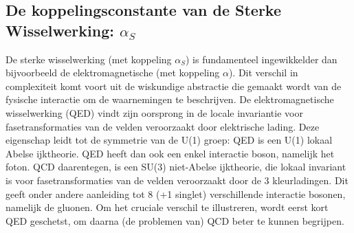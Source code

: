 \documentclass[a4paper,11pt]{article}
\numberwithin{equation}{section} %
\begin{document}
  \subsection{De koppelingsconstante van de Sterke Wisselwerking: $\alpha_S$}
De sterke wisselwerking (met koppeling $\alpha_S$) is fundamenteel ingewikkelder dan bijvoorbeeld de elektromagnetische (met koppeling $\alpha$).
Dit verschil in complexiteit komt voort uit de wiskundige abstractie die gemaakt wordt van de fysische interactie om de waarnemingen te beschrijven.
De elektromagnetische wisselwerking (QED) vindt zijn oorsprong in de locale invariantie voor fasetransformaties van de velden veroorzaakt door elektrische lading.
Deze eigenschap leidt tot de symmetrie van de U(1) groep: QED is een U(1) lokaal Abelse ijktheorie.
QED heeft dan ook een enkel interactie boson, namelijk het foton.
QCD daarentegen, is een SU(3) niet-Abelse ijktheorie, die lokaal invariant is voor fasetransformaties van de velden veroorzaakt door de 3 kleurladingen.
Dit geeft onder andere aanleiding tot 8 (+1 singlet) verschillende interactie bosonen, namelijk de gluonen.
Om het cruciale verschil te illustreren, wordt eerst kort QED geschetst, om daarna (de problemen van) QCD beter te kunnen begrijpen.
\end{document}
